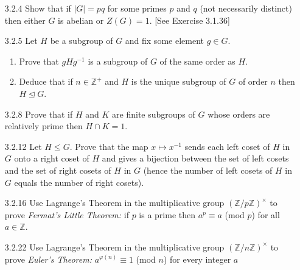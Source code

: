 \documentclass[9pt]{article}
\newcommand{\Z}{\mathbb{Z}}
\begin{document}
\begin{enumerate}
   \item[3.2.4]   Show that if $|G| = pq$ for some primes $p$ and $q$ (not
                  necessarily distinct) then either $G$ is abelian or
                  $Z(G) = 1$. [See Exercise 3.1.36]
   \item[3.2.5]   Let $H$ be a subgroup of $G$ and fix some element $g \in G$.
                  \begin{enumerate}
                     \item Prove that $gHg^{-1}$ is a subgroup of $G$ of the
                           same order as $H$.
                     \item Deduce that if $n \in \Z^+$ and $H$ is the unique
                           subgroup of $G$ of order $n$ then
                           $H \trianglelefteq G$.
                  \end{enumerate}
   \item[3.2.8]   Prove that if $H$ and $K$ are finite subgroups of $G$ whose
                  orders are relatively prime then $H \cap K = 1$.      
   \item[3.2.12]  Let $H \le G$. Prove that the map $x \mapsto x^{-1}$ sends
                  each left coset of $H$ in $G$ onto a right coset of $H$ and
                  gives a bijection between the set of left cosets and the set
                  of right cosets of $H$ in $G$ (hence the number of left cosets
                  of $H$ in $G$ equals the number of right cosets).
   \item[3.2.16]  Use Lagrange's Theorem in the multiplicative group
                  $(\Z/p\Z)^\times$ to prove \textit{Fermat's Little Theorem: }
                  if $p$ is a prime then $a^p \equiv a$ (mod $p$) for all
                  $a \in \Z$.
   \item[3.2.22]  Use Lagrange's Theorem in the multiplicative group
                  $(\Z/n\Z)^\times$ to prove \textit{Euler's Theorem: }
                  $a^{\varphi(n)} \equiv 1$ (mod $n$) for every integer $a$

\end{enumerate}
\end{document}
